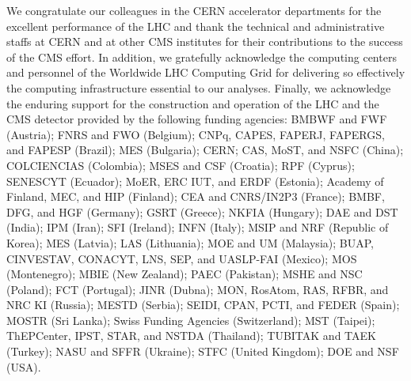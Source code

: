 
\begin{acknowledgments}
We congratulate our colleagues in the CERN accelerator departments for the excellent performance of the LHC and thank the technical and administrative staffs at CERN and at other CMS institutes for their contributions to the success of the CMS effort. In addition, we gratefully acknowledge the computing centers and personnel of the Worldwide LHC Computing Grid for delivering so effectively the computing infrastructure essential to our analyses. Finally, we acknowledge the enduring support for the construction and operation of the LHC and the CMS detector provided by the following funding agencies: BMBWF and FWF (Austria); FNRS and FWO (Belgium); CNPq, CAPES, FAPERJ, FAPERGS, and FAPESP (Brazil); MES (Bulgaria); CERN; CAS, MoST, and NSFC (China); COLCIENCIAS (Colombia); MSES and CSF (Croatia); RPF (Cyprus); SENESCYT (Ecuador); MoER, ERC IUT, and ERDF (Estonia); Academy of Finland, MEC, and HIP (Finland); CEA and CNRS/IN2P3 (France); BMBF, DFG, and HGF (Germany); GSRT (Greece); NKFIA (Hungary); DAE and DST (India); IPM (Iran); SFI (Ireland); INFN (Italy); MSIP and NRF (Republic of Korea); MES (Latvia); LAS (Lithuania); MOE and UM (Malaysia); BUAP, CINVESTAV, CONACYT, LNS, SEP, and UASLP-FAI (Mexico); MOS (Montenegro); MBIE (New Zealand); PAEC (Pakistan); MSHE and NSC (Poland); FCT (Portugal); JINR (Dubna); MON, RosAtom, RAS, RFBR, and NRC KI (Russia); MESTD (Serbia); SEIDI, CPAN, PCTI, and FEDER (Spain); MOSTR (Sri Lanka); Swiss Funding Agencies (Switzerland); MST (Taipei); ThEPCenter, IPST, STAR, and NSTDA (Thailand); TUBITAK and TAEK (Turkey); NASU and SFFR (Ukraine); STFC (United Kingdom); DOE and NSF (USA).
%

\end{acknowledgments}
